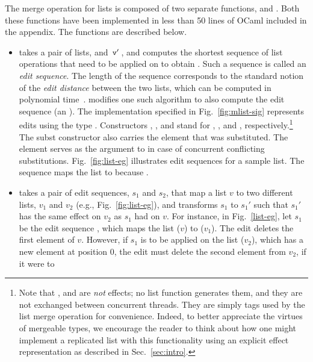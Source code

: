 \noindent The merge operation for lists is composed of two separate functions,
 and . Both these functions have been
implemented in less than 50 lines of OCaml included in the appendix.
The functions are described below.
\begin{itemize}
	\item {} takes a pair of lists,  and $\,{\tt v'}\,$, and computes
		the shortest sequence of list operations that need to be applied on 
		to obtain . Such a sequence is called an \emph{edit sequence}. The
		length of the sequence corresponds to the standard notion of the \emph{edit
		distance} between the two lists, which can be computed in polynomial
		time~\cite{wagner-fischer}.   modifies one such algorithm to
		also compute the edit sequence (an ). The implementation
		specified in Fig.~\ref{fig:mlist-sig} represents edits using the type
		.  Constructors , , and  stand for ,
		, and , respectively.\footnote{ Note that , 
		and  are \emph{not} effects; no list function generates them, and
		they are not exchanged between concurrent threads. They are simply tags
		used by the list merge operation for convenience.  Indeed, to better
		appreciate the virtues of mergeable types, we encourage the reader to
		think about how one might implement a replicated list with this
		functionality using an explicit effect representation as described in
		Sec.~\ref{sec:intro}.}  The subst constructor also carries the 
		element that was substituted. The element serves as the  argument to
		 in case of concurrent conflicting substitutions.
		Fig.~\ref{fig:list-eg} illustrates edit sequences for a sample list.  The
		sequence \C{[I(c,0); S(3,c,s)]} maps the list \C{[a;b;c]} to \C{[c;a;b;s]}
		because .
	\item  {} takes a pair of edit sequences, $s_1$ and $s_2$,
		that map a list $v$ to two different lists, $v_1$ and $v_2$ (e.g.,
		Fig.~\ref{fig:list-eg}), and transforms $s_1$ to $s_1'$ such that $s_1'$
		has the same effect on $v_2$ as $s_1$ had on $v$.  For instance, in
		Fig.~\ref{list-eg}, let $s_1$ be the edit sequence \C{[D(1); S(1,c,d)]},
		which maps the list \C{[a;b;c]} ($v$) to \C{[a;d]} ($v_1$). The  edit
		deletes the first element of $v$. However, if $s_1$ is to be applied on the
		list \C{[c;a;b;s]} ($v_2$), which has a new element at position 0, the
		 edit must delete the second element from $v_2$, if it were to

\end{itemize}
